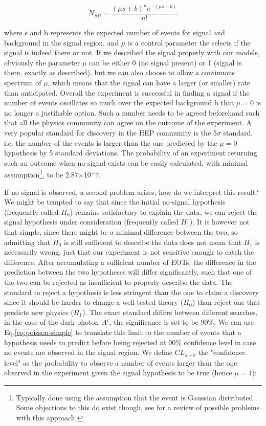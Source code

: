 \begin{equation}
  \label{eq:poisson-simple}
  N_{SR} = \frac{(\mu s + b)^ne^{-(\mu s + b)}}{n!}
\end{equation}

where s and b represents the expected number of events for signal and background in the signal region, and $\mu$ is a control parameter the selects if the signal is indeed there or not. If we described the signal properly with our models, obviously the parameter $\mu$ can be either 0 (no signal present) or 1 (signal is there, exactly as described), but we can also choose to allow a continuous spectrum of $\mu$, which means that the signal can have a larger (or smaller) rate than anticipated. Overall the experiment is successful in finding a signal if the number of events oscillates so much over the expected background b that $\mu = 0$ is no longer a justifiable option. Such a number needs to be agreed beforehand such that all the physics community can agree on the outcome of the experiment. A very popular standard for discovery in the HEP community is the 5$\sigma$ standard, i.e. the number of the events is larger than the one predicted by the $\mu = 0$ hypothesis by 5 standard deviations. The probability of an experiment returning such an outcome when no signal exists can be easily calculated, with minimal assumption\footnote{Typically done using the assumption that the event is Gaussian distributed. Some objections to this do exist though, see \cite{lyons2008} for a review of possible problems with this approach.}, to be 2.87$\times$10$^-7$.

If no signal is observed, a second problem arises, how do we interpret this result? We might be tempted to say that since the initial no-signal hypothesis (frequently called $H_0$) remains satisfactory to explain the data, we can reject the signal hypothesis under consideration (frequently called $H_1$). It is however not that simple, since there might be a minimal difference between the two, so admitting that $H_0$ is still sufficient to describe the data does not mean that $H_1$ is necessarily wrong, just that our experiment is not sensitive enough to catch the difference. After accumulating a sufficient number of EOTs, the difference in the prediction between the two hypotheses will differ significantly, such that one of the two can be rejected as insufficient to properly describe the data. The standard to reject a hypothesis is less stringent than the one to claim a discovery since it should be harder to change a well-tested theory ($H_0$) than reject one that predicts new physics ($H_1$). The exact standard differs between different searches, in the case of the dark photon $A'$, the significance is set to be 90\%. We can use Eq.\ref{eq:poisson-simple} to translate this limit to the number of events that a hypothesis needs to predict before being rejected at 90\% confidence level in case no events are observed in the signal region. We define $CL_{s+b}$ the "confidence level" as the probability to observe a number of events larger than the one observed in the experiment given the signal hypothesis to be true (hence $\mu = 1$):

